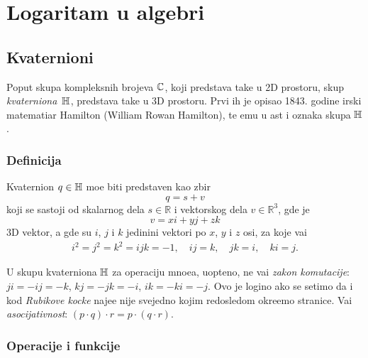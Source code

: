 
\section{Logaritam u algebri}

\subsection{Kvaternioni}

\def\uv{{\hat u}}
\def\vp{{\vec v}}
\def\norm#1{{\Vert#1\Vert}}

Poput skupa kompleksnih brojeva ${\mathbb C}$, koji predstav{\lj}a ta{\cv}ke u 2D prostoru,
skup {\sl kvater\-niona\/}~${\mathbb H}$, predstav{\lj}a ta{\cv}ke u 3D prostoru. Prvi ih je opisao 
1843. godine irski ma\-te\-ma\-ti\-{\cv}ar
Hamilton (William Rowan Hamilton), te {\nj}emu u {\cv}ast i oznaka skupa ${\mathbb H}$.

\subsubsection{Definicija}

Kvaternion $q\in{\mathbb H}$ mo{\zv}e biti predstav{\lj}en kao zbir
\begin{equation}
    q=s+v
\end{equation}
koji se sastoji od skalarnog dela $s\in{\mathbb R}$ i vektorskog dela $v\in{\mathbb R}^3$, gde je
\begin{equation}
    v=xi+yj+zk
\end{equation}
3D vektor, a gde su $i$, $j$ i $k$ jedini{\cv}ni vektori po $x$, $y$ i $z$ osi,
za koje va{\zv}i
\begin{gather}\label{eq:qunits}
    i^2=j^2=k^2=ijk=-1,\quad
    ij=k,\quad jk=i,\quad ki=j. 
\end{gather}

\danger U skupu kvaterniona ${\mathbb H}$ za operaciju mno{\zv}e{\nj}a, uop{\sv}teno, ne va{\zv}i {\sl zakon komutacije}:
$ji=-ij=-k$, $kj=-jk=-i$, $ik=-ki=-j$.
Ovo je logi{\cv}no ako se setimo da i kod
{\sl Rubikove kocke\/} naj{\cv}e{\sv}{\cc}e nije svejedno kojim redosledom okre{\cc}emo stranice.
Va{\zv}i {\sl asocijativnost}: $(p\cdot q)\cdot r=p\cdot(q\cdot r)$.

\subsubsection{Operacije i funkcije}

